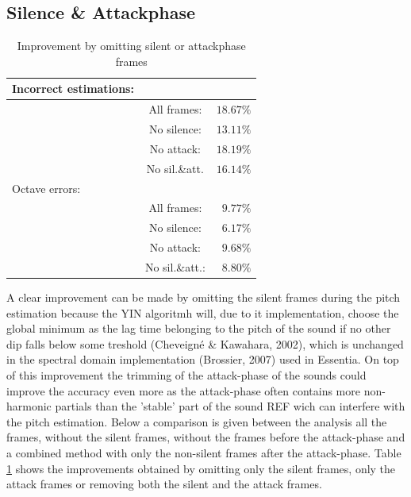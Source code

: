 \documentclass{proc}
\begin{document}
\subsection{Silence \& Attackphase}
\begin{table}[h]
    \begin{center}
        \begin{tabular}{ | l | c | r |}
            \hline
            Incorrect estimations:  &                   &               \\  \hline
                                    &   All frames:     &   $18.67\%$   \\  \hline
                                    &   No silence:     &   $13.11\%$    \\  \hline
                                    &   No attack:      &   $18.19\%$    \\  \hline
                                    &   No sil.\&att.   &   $16.14\%$    \\  \hline
            Octave errors:      &                   &               \\  \hline
                                &   All frames:     &   $9.77\%$   \\  \hline
                                &   No silence:     &   $6.17\%$   \\  \hline
                                &   No attack:      &   $9.68\%$   \\  \hline
                                &   No sil.\&att.:  &   $8.80\%$   \\  \hline
        \end{tabular}
        \caption{Improvement by omitting silent or attackphase frames}
        \label{table:impr_sil}
    \end{center}
\end{table}
A clear improvement can be made by omitting the silent frames during the pitch estimation because the YIN algoritmh will, due to it implementation, choose the global minimum as the lag time belonging to the pitch of the sound if no other dip falls below some treshold (Cheveigné \& Kawahara, 2002), which is unchanged in the spectral domain implementation (Brossier, 2007) used in Essentia. On top of this improvement the trimming of the attack-phase of the sounds could improve the accuracy even more as the attack-phase often contains more non-harmonic partials than the 'stable' part of the sound REF wich can interfere with the pitch estimation. Below a comparison is given between the analysis all the frames, without the silent frames, without the frames before the attack-phase and a combined method with only the non-silent frames after the attack-phase. Table \ref{table:impr_sil} shows the improvements obtained by omitting only the silent frames, only the attack frames or removing both the silent and the attack frames.
\end{document}

